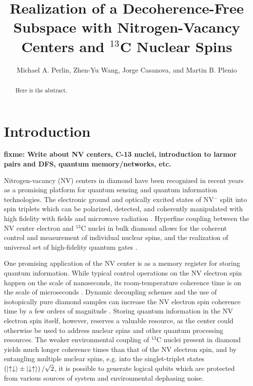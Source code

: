 \documentclass[twocolumn]{revtex4-1}
\newcommand{\p}[1]{\left(#1\right)} %
\renewcommand{\u}{\uparrow}
\renewcommand{\d}{\downarrow}
\newcommand{\fixme}[1]{{\bf \color{red} fixme: #1}}
\begin{document}
\title{Realization of a Decoherence-Free Subspace with
  Nitrogen-Vacancy Centers and $^{13}$C Nuclear Spins}

\author{Michael A. Perlin, Zhen-Yu Wang, Jorge Casanova, and Martin B. Plenio}


\begin{abstract}
  Here is the abstract.
\end{abstract}

\maketitle

\section{Introduction}

\fixme{Write about NV centers, C-13 nuclei, introduction to larmor
  pairs and DFS, quantum memory/networks, etc.}

Nitrogen-vacancy (NV) centers in diamond have been recognized in
recent years as a promising platform for quantum sensing and quantum
information technologies\cite{mamin2013nanoscale, steinert2010high,
  wang2016positioning, chou2015optimal, childress2006fault,
  yao2012scalable}. The electronic ground and optically excited states
of NV$^-$ split into spin triplets which can be polarized, detected,
and coherently manipulated with high fidelity with fields and
microwave radiation \cite{dobrovitski2013quantum}. Hyperfine coupling
between the NV center electron and $^{13}$C nuclei in bulk diamond
allows for the coherent control and measurement of individual nuclear
spins, and the realization of universal set of high-fidelity quantum
gates \cite{dobrovitski2013quantum, casanova2016noise}.

One promising application of the NV center is as a memory register for
storing quantum information. While typical control operations on the
NV electron spin happen on the scale of nanoseconds, its
room-temperature coherence time is on the scale of microseconds
\cite{dobrovitski2013quantum}. Dynamic decoupling schemes and the use
of isotopically pure diamond samples can increase the NV electron spin
coherence time by a few orders of magnitude
\cite{ryan2010robust}. Storing quantum information in the NV electron
spin itself, however, reserves a valuable resource, as the center
could otherwise be used to address nuclear spins and other quantum
processing resources. The weaker environmental coupling of $^{13}$C
nuclei present in diamond yields much longer coherence times than that
of the NV electron spin, and by entangling multiple nuclear spins,
e.g. into the singlet-triplet states
$\p{\ket{\u\d}\pm\ket{\d\u}}/\sqrt2$, it is possible to generate
logical qubits which are protected from various sources of system and
environmental dephasing noise.
\end{document}
